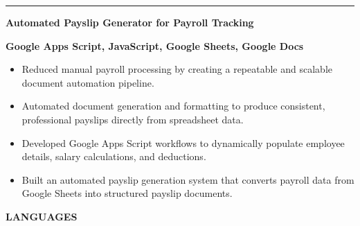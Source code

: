 \documentclass[11pt, a4paper]{article}
\newcommand{\cvsection}[1]{%
  \vspace{6pt}%
  \noindent%
  \colorbox{DKGreen}{\hspace{4pt}\rule{0pt}{14pt}\hspace{4pt}}%
  \colorbox{CardBG}{%
    \parbox[c][14pt]{\dimexpr\linewidth-16pt\relax}{%
      \hspace{8pt}\textcolor{DKGreen}{\textbf{\large\MakeUppercase{#1}}}%
    }%
  }%
  \par
  \noindent{\color{BorderClr}\rule{\linewidth}{0.6pt}}%
  \vspace{4pt}\par\noindent%
}
\begin{document}
\vspace{8pt}
\noindent%
{\color{DKGreen}\rule{4pt}{14pt}}\hspace{6pt}%
\textcolor{DarkTxt}{\textbf{\large Automated Payslip Generator for Payroll Tracking}}\par
\vspace{1pt}
\noindent\hspace{10pt}\textcolor{DKGreen}{\textbf{\small Google Apps Script, JavaScript, Google Sheets, Google Docs}}
\vspace{2pt}
\begin{itemize}
  \item \textcolor{MidTxt}{Reduced manual payroll processing by creating a repeatable and scalable document automation pipeline.}
  \item \textcolor{MidTxt}{Automated document generation and formatting to produce consistent, professional payslips directly from spreadsheet data.}
  \item \textcolor{MidTxt}{Developed Google Apps Script workflows to dynamically populate employee details, salary calculations, and deductions.}
  \item \textcolor{MidTxt}{Built an automated payslip generation system that converts payroll data from Google Sheets into structured payslip documents.}
\end{itemize}
\vspace{2pt}

\cvsection{Languages}
\end{document}

